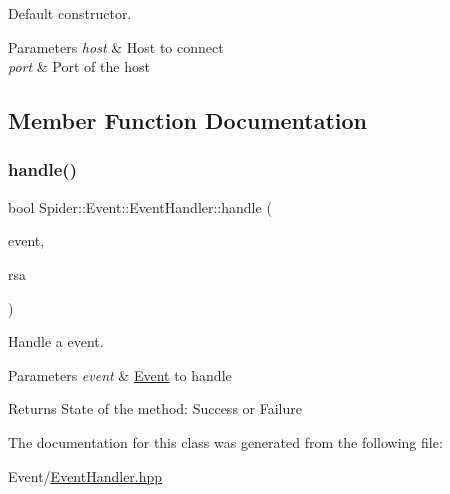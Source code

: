 Default constructor. 


\begin{DoxyParams}{Parameters}
{\em host} & Host to connect \\
\hline
{\em port} & Port of the host \\
\hline
\end{DoxyParams}


\subsection{Member Function Documentation}
\mbox{\label{class_spider_1_1_event_1_1_event_handler_a09a8b1b3bfce070dc83226db55c7664f}} 
\subsubsection{\texorpdfstring{handle()}{handle()}}
{\footnotesize\ttfamily bool Spider\+::\+Event\+::\+Event\+Handler\+::handle (\begin{DoxyParamCaption}\item[{const std\+::shared\+\_\+ptr$<$ \hyperlink{class_spider_1_1_event_1_1_i_event}{I\+Event} $>$ \&}]{event,  }\item[{const \hyperlink{class_spider_1_1ssl_1_1_r_s_a_keys}{ssl\+::\+R\+S\+A\+Keys} \&}]{rsa }\end{DoxyParamCaption})}



Handle a event. 


\begin{DoxyParams}{Parameters}
{\em event} & \hyperlink{namespace_spider_1_1_event}{Event} to handle \\
\hline
\end{DoxyParams}
\begin{DoxyReturn}{Returns}
State of the method\+: Success or Failure 
\end{DoxyReturn}


The documentation for this class was generated from the following file\+:\begin{DoxyCompactItemize}
\item 
Event/\hyperlink{_event_handler_8hpp}{Event\+Handler.\+hpp}\end{DoxyCompactItemize}
